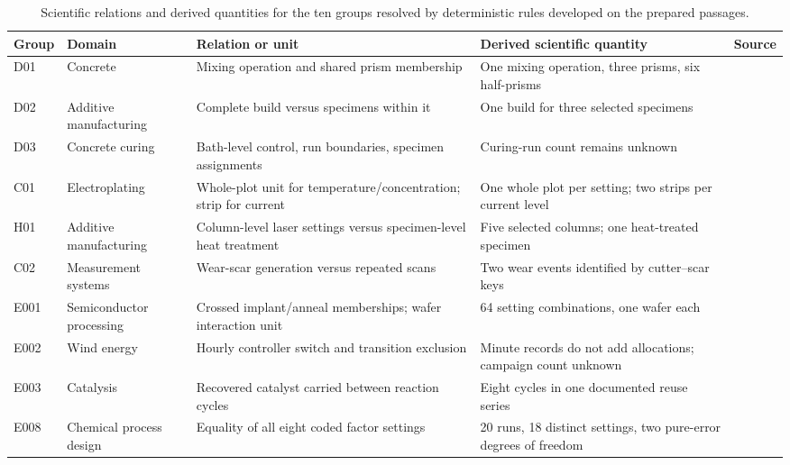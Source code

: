 \begin{table}[t]
\centering
\footnotesize
\setlength{\tabcolsep}{4pt}
\begin{tabular}{@{}p{}p{}p{}p{}p{}@{}}
\toprule
Group & Domain & Relation or unit & Derived scientific quantity & Source \\
\midrule
D01 & Concrete & Mixing operation and shared prism membership & One mixing operation, three prisms, six half-prisms & \citep{rezazadeh2026dataset} \\
D02 & Additive manufacturing & Complete build versus specimens within it & One build for three selected specimens & \citep{SHANBHAG2021107613} \\
D03 & Concrete curing & Bath-level control, run boundaries, specimen assignments & Curing-run count remains unknown & \citep{rezazadeh2026dataset} \\
C01 & Electroplating & Whole-plot unit for temperature/concentration; strip for current & One whole plot per setting; two strips per current level & \citep{nistUndatedNested} \\
H01 & Additive manufacturing & Column-level laser settings versus specimen-level heat treatment & Five selected columns; one heat-treated specimen & \citep{weaver2021demonstration} \\
C02 & Measurement systems & Wear-scar generation versus repeated scans & Two wear events identified by cutter--scar keys & \citep{wigginsUndatedMeasurement} \\
E001 & Semiconductor processing & Crossed implant/anneal memberships; wafer interaction unit & 64 setting combinations, one wafer each & \citep{nistUndatedNested} \\
E002 & Wind energy & Hourly controller switch and transition exclusion & Minute records do not add allocations; campaign count unknown & \citep{simley2021results} \\
E003 & Catalysis & Recovered catalyst carried between reaction cycles & Eight cycles in one documented reuse series & \citep{rafi2020copper} \\
E008 & Chemical process design & Equality of all eight coded factor settings & 20 runs, 18 distinct settings, two pure-error degrees of freedom & \citep{stallrich2026powerful,nistUndatedFoldover} \\
\bottomrule
\end{tabular}
\caption{Scientific relations and derived quantities for the ten groups resolved by deterministic rules developed on the prepared passages.}
\label{tab:code-cases}
\end{table}

